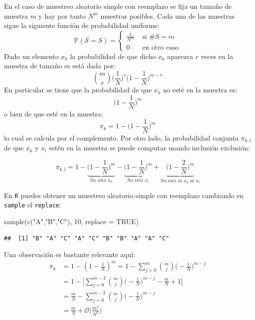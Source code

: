 \documentclass[
]{book}
\newenvironment{Shaded}{\begin{snugshade}}{\end{snugshade}}
\newcommand{\AttributeTok}[1]{\textcolor[rgb]{0.77,0.63,0.00}{#1}}
\newcommand{\ConstantTok}[1]{\textcolor[rgb]{0.00,0.00,0.00}{#1}}
\newcommand{\DecValTok}[1]{\textcolor[rgb]{0.00,0.00,0.81}{#1}}
\newcommand{\FunctionTok}[1]{\textcolor[rgb]{0.00,0.00,0.00}{#1}}
\newcommand{\NormalTok}[1]{#1}
\newcommand{\StringTok}[1]{\textcolor[rgb]{0.31,0.60,0.02}{#1}}
\begin{document}
En el caso de muestreo aleatorio simple con reemplazo se fija un tamaño de muestra \(m\) y hay por tanto \(N^m\) muestras posibles. Cada una de las muestras sigue la siguiente función de probabilidad uniforme:
\[
\mathbb{P}(\mathcal{S} = S) = \begin{cases}
\frac{1}{N^m} & \text{ si } \#S = m\\
0 & \text{ en otro caso}
\end{cases}
\]
Dado un elemento \(x_k\) la probabilidad de que dicho \(x_k\) aparezca \(r\) veces en la muestra de tamaño \(m\) está dada por:
\[
\binom{m}{r}\Big(\frac{1}{N}\Big)^r \Big( 1 - \frac{1}{N}\Big)^{m - r}
\]
En particular se tiene que la probabilidad de que \(x_k\) no esté en la muestra es:
\[
\Big( 1 - \frac{1}{N}\Big)^m
\]
o bien de que esté en la muestra:
\[
\pi_k = 1 - \Big( 1 - \frac{1}{N}\Big)^m
\]
lo cual se calcula por el complemento. Por otro lado, la probabilidad conjunta \(\pi_{k,l}\) de que \(x_k\) y \(x_l\) estén en la muestra se puede computar usando inclusión exclusión:

\[
\pi_{k,l} = 1 - \underbrace{\Big( 1 - \frac{1}{N}\Big)^m}_{\text{No está }x_k} - \underbrace{\Big( 1 - \frac{1}{N}\Big)^m}_{\text{No está }x_l} + \underbrace{\Big( 1 - \frac{2}{N}\Big)^m}_{\text{No está ni }x_k\text{ ni }x_l}
\]

En \texttt{R} puedes obtener un muestreo aleatorio simple con reemplazo cambiando en \texttt{sample} el \texttt{replace}:

\begin{Shaded}
\begin{Highlighting}[]
\FunctionTok{sample}\NormalTok{(}\FunctionTok{c}\NormalTok{(}\StringTok{"A"}\NormalTok{,}\StringTok{"B"}\NormalTok{,}\StringTok{"C"}\NormalTok{), }\DecValTok{10}\NormalTok{, }\AttributeTok{replace =} \ConstantTok{TRUE}\NormalTok{)}
\end{Highlighting}
\end{Shaded}

\begin{verbatim}
##  [1] "B" "A" "C" "A" "C" "B" "B" "A" "A" "C"
\end{verbatim}

Una observación es bastante relevante aquí:
\begin{align*}
\pi_k & = 1 - (1 - \frac{1}{N})^m = 1 - \sum\limits_{j = 0}^m\binom{m}{j}\big( - \frac{1}{N})^{m-j}
\\ & = 1 - \bigg[ \sum\limits_{j = 0}^{m-2}\binom{m}{j}\Big(-\frac{1}{N}\Big)^{m-j} - \frac{m}{N} + 1\bigg] 
\\ & = \frac{m}{N} - \sum\limits_{j = 0}^{m-2}\binom{m}{j}\Big(-\frac{1}{N}\Big)^{m-j} \\ & = \frac{m}{N} + \mathcal{O}\Bigg( \frac{m^2}{N^2}\Bigg)
\end{align*}
\end{document}
